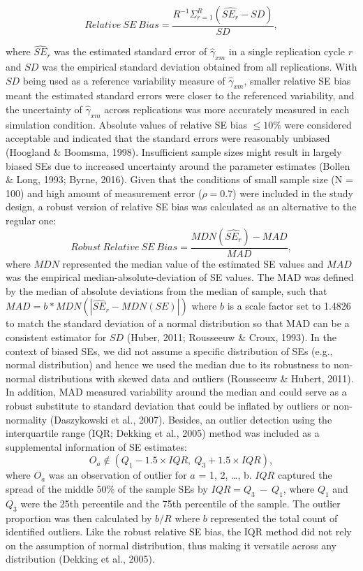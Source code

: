 \documentclass[
  man]{apa6}
\begin{document}
\begin{equation}
Relative\ SE\ Bias = \frac{R^{-1}\Sigma^{R}_{r = 1}(\widehat{SE_{r}} - SD)}{SD},
\end{equation}

where \(\widehat{SE}_{r}\) was the estimated standard error of \(\hat{\gamma}_{xm}\) in a single replication cycle \(r\) and \(SD\) was the empirical standard deviation obtained from all replications. With \(SD\) being used as a reference variability measure of \(\hat{\gamma}_{xm}\), smaller relative SE bias meant the estimated standard errors were closer to the referenced variability, and the uncertainty of \(\hat{\gamma}_{xm}\) across replications was more accurately measured in each simulation condition. Absolute values of relative SE bias \(\le 10\%\) were considered acceptable and indicated that the standard errors were reasonably unbiased (Hoogland \(\&\) Boomsma, 1998). Insufficient sample sizes might result in largely biased SEs due to increased uncertainty around the parameter estimates (Bollen \& Long, 1993; Byrne, 2016). Given that the conditions of small sample size (N = 100) and high amount of measurement error (\(\rho = 0.7\)) were included in the study design, a robust version of relative SE bias was calculated as an alternative to the regular one:
\begin{equation}
Robust\ Relative\ SE\ Bias = \frac{MDN(\widehat{SE_{r}}) - MAD}{MAD},
\end{equation}
where \(MDN\) represented the median value of the estimated SE values and \(MAD\) was the empirical median-absolute-deviation of SE values. The MAD was defined by the median of absolute deviations from the median of sample, such that \(MAD = b*MDN(|\widehat{SE}_{r} - MDN(SE)|)\) where \(b\) is a scale factor set to 1.4826 to match the standard deviation of a normal distribution so that MAD can be a consistent estimator for \(SD\) (Huber, 2011; Rousseeuw \& Croux, 1993). In the context of biased SEs, we did not assume a specific distribution of SEs (e.g., normal distribution) and hence we used the median due to its robustness to non-normal distributions with skewed data and outliers (Rousseeuw \& Hubert, 2011). In addition, MAD measured variability around the median and could serve as a robust substitute to standard deviation that could be inflated by outliers or non-normality (Daszykowski et al., 2007).
Besides, an outlier detection using the interquartile range (IQR; Dekking et al., 2005) method was included as a supplemental information of SE estimates:
\begin{equation}
O_{a} \not\in (Q_{1} - 1.5 \times IQR, \ Q_{3} + 1.5 \times IQR),
\end{equation}
where \(O_{a}\) was an observation of outlier for \(a\) = 1, 2, \ldots, b. \(IQR\) captured the spread of the middle 50\(\%\) of the sample SEs by \(IQR = Q_{3} \ - \ Q_{1}\), where \(Q_{1}\) and \(Q_{3}\) were the 25th percentile and the 75th percentile of the sample. The outlier proportion was then calculated by \(b/R\) where \(b\) represented the total count of identified outliers. Like the robust relative SE bias, the IQR method did not rely on the assumption of normal distribution, thus making it versatile across any distribution (Dekking et al., 2005).
\end{document}
